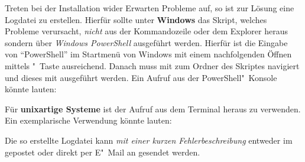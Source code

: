 Treten bei der Installation wider Erwarten Probleme auf, so ist zur Lösung eine 
Logdatei zu erstellen. Hierfür sollte unter \textbf{Windows} das Skript, 
welches Probleme verursacht, \emph{nicht} aus der Kommandozeile oder dem 
Explorer heraus sondern über \emph{Windows PowerShell} ausgeführt werden. 
Hierfür ist die Eingabe von \enquote{PowerShell} im Startmenü von Windows mit 
einem nachfolgenden Öffnen mittels "~Taste ausreichend. 
Danach muss mit  zum Ordner des Skriptes navigiert und dieses mit 
ausgeführt werden. Ein Aufruf aus der PowerShell"~Konsole könnte lauten:
%
\begin{quoting}[rightmargin=0pt]
  \newline%
\end{quoting}
%
Für \textbf{unixartige Systeme} ist der Aufruf 
 aus dem Terminal heraus zu 
verwenden. Ein exemplarische Verwendung könnte lauten:
%
\begin{quoting}
  \newline
\end{quoting}
%
Die so erstellte Logdatei kann \emph{mit einer kurzen Fehlerbeschreibung} 
entweder im \Forum* gepostet oder direkt per E"~Mail an \mailto{\tudscrmail} 
gesendet werden.
%
